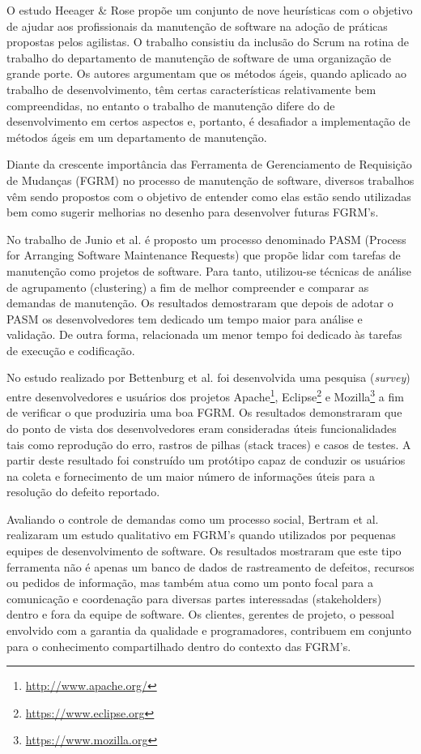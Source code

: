 \documentclass[msc]{ppgccufmg} %
\begin{document}
O estudo Heeager \& Rose \cite{Heeager2015} propõe um conjunto de nove heurísticas com o objetivo de ajudar aos profissionais da manutenção de software na adoção de práticas propostas pelos agilistas. O trabalho consistiu da inclusão do Scrum na rotina de trabalho do departamento de manutenção de software de uma organização de grande porte. Os autores argumentam que os métodos ágeis, quando aplicado ao trabalho de desenvolvimento, têm certas características relativamente bem compreendidas, no entanto o trabalho de manutenção difere do de desenvolvimento em certos aspectos e, portanto, é desafiador a implementação de métodos ágeis em um departamento de manutenção.

Diante da crescente importância das Ferramenta de Gerenciamento de Requisição de Mudanças (FGRM) no processo de manutenção de software, diversos trabalhos vêm sendo propostos com o objetivo de entender como elas estão sendo utilizadas bem como sugerir melhorias no desenho para desenvolver futuras FGRM's.

No trabalho de Junio et al. \cite{5741246} é proposto um processo denominado PASM (Process for Arranging
Software Maintenance Requests) que propõe lidar com tarefas de manutenção como projetos de software. Para tanto, utilizou-se técnicas de análise de agrupamento (clustering) a fim de melhor compreender e comparar as demandas de manutenção. Os resultados demostraram que depois de adotar o PASM os
desenvolvedores tem dedicado um tempo maior para análise e validação. De outra forma, relacionada um menor tempo foi dedicado às tarefas de execução e codificação.

No estudo realizado por Bettenburg et al. \cite{bettenburg2008makes} foi
desenvolvida uma pesquisa (\textit{survey}) entre desenvolvedores e usuários dos
projetos Apache\footnote{\url{http://www.apache.org/}}, Eclipse\footnote{\url{https://www.eclipse.org}} e Mozilla\footnote{\url{https://www.mozilla.org}} a fim de verificar o que
produziria uma boa FGRM. Os resultados demonstraram que do ponto de vista dos desenvolvedores eram consideradas úteis funcionalidades tais como reprodução do erro, rastros de pilhas (stack traces) e casos de testes. A partir deste resultado foi construído um protótipo capaz de conduzir os usuários na coleta e fornecimento de um maior número de informações úteis para a resolução do defeito reportado.

Avaliando o controle de demandas como um processo social, Bertram et
al. \cite{Bertram:2010:CCB:1718918.1718972} realizaram um estudo qualitativo em
FGRM's quando utilizados por pequenas equipes de desenvolvimento de software. Os resultados mostraram que este tipo ferramenta não é apenas um banco de dados de rastreamento de defeitos, recursos ou pedidos de informação, mas também atua como um ponto focal para a comunicação e coordenação para diversas partes interessadas (stakeholders) dentro e fora da equipe de software. Os
clientes, gerentes de projeto, o pessoal envolvido com a garantia da qualidade
e programadores, contribuem em conjunto para o conhecimento compartilhado dentro do contexto das FGRM's.
\end{document}
